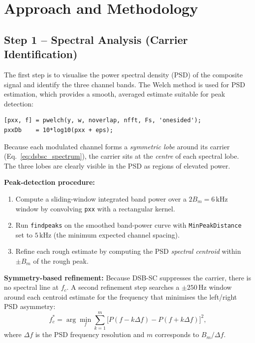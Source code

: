 \documentclass[12pt, a4paper]{article}
\begin{document}
\section{Approach and Methodology}

\subsection{Step 1 -- Spectral Analysis (Carrier Identification)}

The first step is to visualise the power spectral density (PSD) of the
composite signal and identify the three channel bands. The Welch method is
used for PSD estimation, which provides a smooth, averaged estimate suitable
for peak detection:

\begin{lstlisting}[caption={Welch PSD estimation (excerpt from \texttt{modulated\_analysis.m})},label={lst:psd}]
[pxx, f] = pwelch(y, w, noverlap, nfft, Fs, 'onesided');
pxxDb    = 10*log10(pxx + eps);
\end{lstlisting}

Because each modulated channel forms a \emph{symmetric lobe} around its carrier
(Eq.~\ref{eq:dsbsc_spectrum}), the carrier sits at the \emph{centre} of each
spectral lobe. The three lobes are clearly visible in the PSD as regions of
elevated power.

\textbf{Peak-detection procedure:}
\begin{enumerate}[nosep]
    \item Compute a sliding-window integrated band power over a $2B_m=6\,\text{kHz}$
          window by convolving \texttt{pxx} with a rectangular kernel.
    \item Run \texttt{findpeaks} on the smoothed band-power curve with
          \texttt{MinPeakDistance} set to $5\,\text{kHz}$ (the minimum expected
          channel spacing).
    \item Refine each rough estimate by computing the PSD \emph{spectral
          centroid} within $\pm B_m$ of the rough peak.
\end{enumerate}

\textbf{Symmetry-based refinement:} Because DSB-SC suppresses the carrier,
there is no spectral line at $f_c$. A second refinement step searches a
$\pm 250\,\text{Hz}$ window around each centroid estimate for the frequency
that minimises the left/right PSD asymmetry:
\begin{equation}
    f_c^* = \arg\min_f \sum_{k=1}^{m}\bigl[P(f-k\Delta f)-P(f+k\Delta f)\bigr]^2,
    \label{eq:symmetry}
\end{equation}
where $\Delta f$ is the PSD frequency resolution and $m$ corresponds to
$B_m / \Delta f$.
\end{document}

